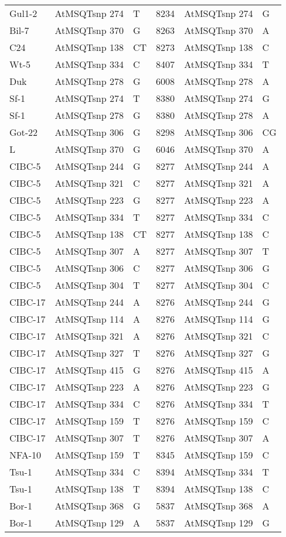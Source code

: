 \begin{center}
\begin{longtable}{|l|l|l|l|l|l|}
Gul1-2&AtMSQTsnp 274&T&8234&AtMSQTsnp 274&G\\
Bil-7&AtMSQTsnp 370&G&8263&AtMSQTsnp 370&A\\
C24&AtMSQTsnp 138&CT&8273&AtMSQTsnp 138&C\\
Wt-5&AtMSQTsnp 334&C&8407&AtMSQTsnp 334&T\\
Duk&AtMSQTsnp 278&G&6008&AtMSQTsnp 278&A\\
Sf-1&AtMSQTsnp 274&T&8380&AtMSQTsnp 274&G\\
Sf-1&AtMSQTsnp 278&G&8380&AtMSQTsnp 278&A\\
Got-22&AtMSQTsnp 306&G&8298&AtMSQTsnp 306&CG\\
L&AtMSQTsnp 370&G&6046&AtMSQTsnp 370&A\\
CIBC-5&AtMSQTsnp 244&G&8277&AtMSQTsnp 244&A\\
CIBC-5&AtMSQTsnp 321&C&8277&AtMSQTsnp 321&A\\
CIBC-5&AtMSQTsnp 223&G&8277&AtMSQTsnp 223&A\\
CIBC-5&AtMSQTsnp 334&T&8277&AtMSQTsnp 334&C\\
CIBC-5&AtMSQTsnp 138&CT&8277&AtMSQTsnp 138&C\\
CIBC-5&AtMSQTsnp 307&A&8277&AtMSQTsnp 307&T\\
CIBC-5&AtMSQTsnp 306&C&8277&AtMSQTsnp 306&G\\
CIBC-5&AtMSQTsnp 304&T&8277&AtMSQTsnp 304&C\\
CIBC-17&AtMSQTsnp 244&A&8276&AtMSQTsnp 244&G\\
CIBC-17&AtMSQTsnp 114&A&8276&AtMSQTsnp 114&G\\
CIBC-17&AtMSQTsnp 321&A&8276&AtMSQTsnp 321&C\\
CIBC-17&AtMSQTsnp 327&T&8276&AtMSQTsnp 327&G\\
CIBC-17&AtMSQTsnp 415&G&8276&AtMSQTsnp 415&A\\
CIBC-17&AtMSQTsnp 223&A&8276&AtMSQTsnp 223&G\\
CIBC-17&AtMSQTsnp 334&C&8276&AtMSQTsnp 334&T\\
CIBC-17&AtMSQTsnp 159&T&8276&AtMSQTsnp 159&C\\
CIBC-17&AtMSQTsnp 307&T&8276&AtMSQTsnp 307&A\\
NFA-10&AtMSQTsnp 159&T&8345&AtMSQTsnp 159&C\\
Tsu-1&AtMSQTsnp 334&C&8394&AtMSQTsnp 334&T\\
Tsu-1&AtMSQTsnp 138&T&8394&AtMSQTsnp 138&C\\
Bor-1&AtMSQTsnp 368&G&5837&AtMSQTsnp 368&A\\
Bor-1&AtMSQTsnp 129&A&5837&AtMSQTsnp 129&G\\

\end{longtable}
\end{center}
